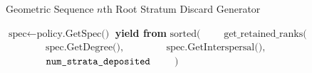 \begin{algorithm}
\caption{Geometric Sequence $n$th Root Stratum Discard Generator}
\label{alg:geom-seq-nth-root-algo-gen-drop-ranks}
\begin{algorithmic}[1]
\STATE $\text{spec} \gets \text{policy.GetSpec()}$
\STATE \textbf{yield from} $\text{sorted(}$
\STATE $\qquad \text{get\_retained\_ranks(}$
\STATE $\qquad \qquad \text{spec.GetDegree(),}$
\STATE $\qquad \qquad \text{spec.GetInterspersal(),}$
\STATE $\qquad \qquad \texttt{num\_\text{strata}\_\text{deposited}}$
\STATE $\qquad \text{)}$
\end{algorithmic}
\end{algorithm}
